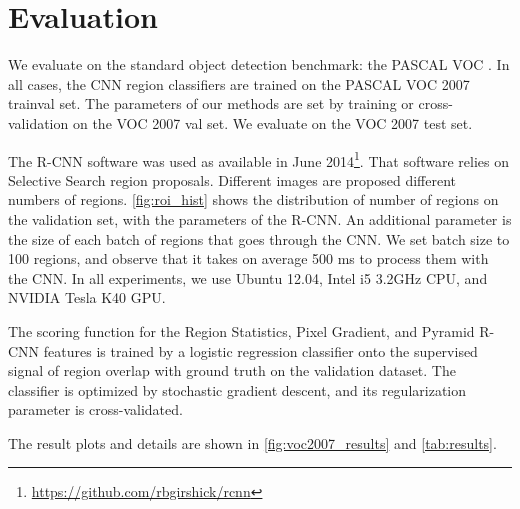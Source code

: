 \section{Evaluation}\label{sec:evaluation}

We evaluate on the standard object detection benchmark: the PASCAL VOC \cite{pascal-voc-2010}.
In all cases, the CNN region classifiers are trained on the PASCAL VOC 2007 trainval set.
The parameters of our methods are set by training or cross-validation on the VOC 2007 val set.
We evaluate on the VOC 2007 test set.

The R-CNN software was used as available in June 2014\footnote{\url{https://github.com/rbgirshick/rcnn}}.
That software relies on Selective Search \cite{Uijlings-IJCV-2013} region proposals.
Different images are proposed different numbers of regions.
\autoref{fig:roi_hist} shows the distribution of number of regions on the validation set, with the parameters of the R-CNN.
An additional parameter is the size of each batch of regions that goes through the CNN.
We set batch size to 100 regions, and observe that it takes on average 500 ms to process them with the CNN.
In all experiments, we use Ubuntu 12.04, Intel i5 3.2GHz CPU, and NVIDIA Tesla K40 GPU.

The scoring function for the Region Statistics, Pixel Gradient, and Pyramid R-CNN features is trained by a logistic regression classifier onto the supervised signal of region overlap with ground truth on the validation dataset.
The classifier is optimized by stochastic gradient descent, and its regularization parameter is cross-validated.

The result plots and details are shown in \autoref{fig:voc2007_results} and \autoref{tab:results}.

